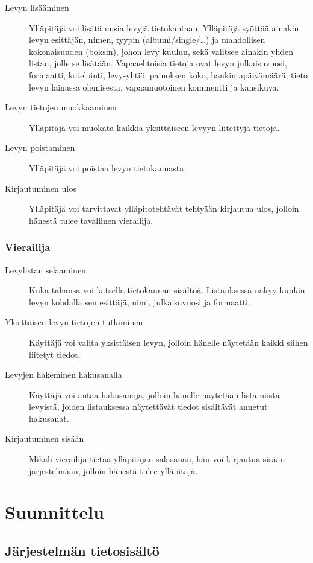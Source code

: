 \documentclass[a4paper,12pt]{report}
\begin{document}
\begin{description}
  \item[Levyn lisääminen] Ylläpitäjä voi lisätä uusia levyjä tietokantaan.
    Ylläpitäjä syöttää ainakin levyn esittäjän, nimen, tyypin
    (albumi/single/\ldots) ja mahdollisen kokonaisuuden (boksin), johon levy
    kuuluu, sekä valitsee ainakin yhden listan, jolle se lisätään.
    Vapaaehtoisia tietoja ovat levyn julkaisuvuosi, formaatti, kotelointi,
    levy-yhtiö, painoksen koko, hankintapäivämäärä, tieto levyn lainassa
    olemisesta, vapaamuotoinen kommentti ja kansikuva.
  \item[Levyn tietojen muokkaaminen] Ylläpitäjä voi muokata kaikkia
    yksittäiseen levyyn liitettyjä tietoja.
  \item[Levyn poistaminen] Ylläpitäjä voi poistaa levyn tietokannasta.
  \item[Kirjautuminen ulos] Ylläpitäjä voi tarvittavat ylläpitotehtävät
    tehtyään kirjautua ulos, jolloin hänestä tulee tavallinen vierailija.
\end{description}

\subsection{Vierailija}

\begin{description}
  \item[Levylistan selaaminen] Kuka tahansa voi katsella tietokannan
    sisältöä.  Listauksessa näkyy kunkin levyn kohdalla sen esittäjä, nimi,
    julkaisuvuosi ja formaatti.
  \item[Yksittäisen levyn tietojen tutkiminen] Käyttäjä voi valita
    yksittäisen levyn, jolloin hänelle näytetään kaikki siihen liitetyt
    tiedot.
  \item[Levyjen hakeminen hakusanalla] Käyttäjä voi antaa hakusanoja,
    jolloin hänelle näytetään lista niistä levyistä, joiden listauksessa
    näytettävät tiedot sisältävät annetut hakusanat.
  \item[Kirjautuminen sisään] Mikäli vierailija tietää ylläpitäjän
    salasanan, hän voi kirjautua sisään järjestelmään, jolloin hänestä tulee
    ylläpitäjä.
\end{description}

\chapter{Suunnittelu}

\section{Järjestelmän tietosisältö}
\end{document}
